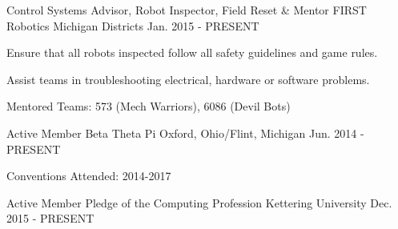 

\begin{cventries}

  \cventry
    {Control Systems Advisor, Robot Inspector, Field Reset \& Mentor} %
    {FIRST Robotics} %
    {Michigan Districts} %
    {Jan. 2015 - PRESENT} %
    {
      \begin{cvitems} %
        \item {Ensure that all robots inspected follow all safety guidelines and game rules.}
        \item {Assist teams in troubleshooting electrical, hardware or software problems.}
        \item {Mentored Teams: 573 (Mech Warriors), 6086 (Devil Bots)}
      \end{cvitems}
    }

  \cventry
    {Active Member} %
    {Beta Theta Pi} %
    {Oxford, Ohio/Flint, Michigan} %
    {Jun. 2014 - PRESENT} %
    {
      \begin{cvitems} %
        \item {Conventions Attended: 2014-2017}
      \end{cvitems}
    }

  \cventry
    {Active Member} %
    {Pledge of the Computing Profession} %
    {Kettering University} %
    {Dec. 2015 - PRESENT} %
    {
      \begin{cvitems} %
      \end{cvitems}
    }


\end{cventries}

